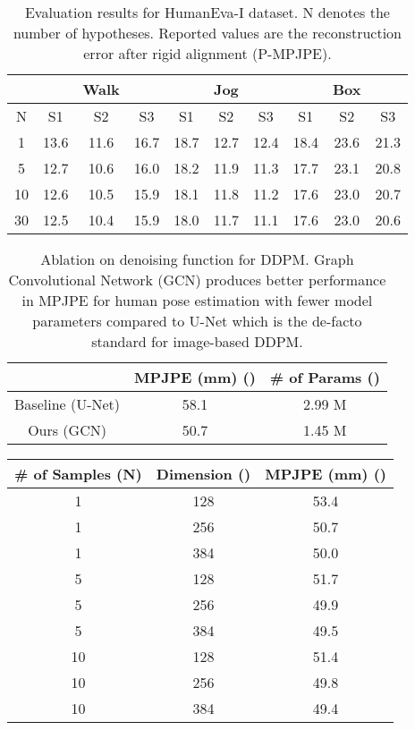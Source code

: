 \documentclass[letterpaper, 10 pt, conference]{ieeeconf}
\begin{document}
\begin{table}[t]
    \centering
    \resizebox{0.45\textwidth}{!}
    {
    \begin{tabular}{c|c c c|c c c|c c c}
    \toprule
          & & Walk & & & Jog & & & Box & \\\hline
         N& S1 & S2 & S3 & S1 & S2 & S3 & S1 & S2 & S3\\
    \midrule
         1 &  13.6& 11.6 & 16.7 & 18.7 & 12.7 &12.4 &  18.4 & 23.6 & 21.3\\
         5 & 12.7& 10.6& 16.0 & 18.2&11.9 &11.3 & 17.7 & 23.1 & 20.8\\
         10 & 12.6 &10.5 &15.9 &18.1 &11.8 &11.2 &17.6 &23.0 & 20.7 \\
         30 & 12.5 & 10.4& 15.9& 18.0& 11.7& 11.1& 17.6 & 23.0 & 20.6\\

    \bottomrule
    \end{tabular}
    }
    \caption{Evaluation results for HumanEva-I dataset. N denotes the number of hypotheses. Reported values are the reconstruction error after rigid alignment (P-MPJPE).}
    \label{tab:table5}
\end{table} \begin{table}[t]
    \centering
    \resizebox{0.4\textwidth}{!}
    {
    \begin{tabular}{c|c|c}
    \toprule
    &MPJPE (mm) ()& \# of Params ()\\
    \midrule
         Baseline (U-Net) & 58.1&2.99 M \\
         Ours (GCN)& 50.7 & 1.45 M\\
    \bottomrule
    \end{tabular}
    }
    \caption{Ablation on denoising function for DDPM.
    Graph Convolutional Network (GCN) produces better performance in MPJPE for human pose estimation with fewer model parameters compared to U-Net which is the de-facto standard for image-based DDPM.
    }
    \label{tab:table2}
    \vspace{-10pt}
\end{table} \begin{table}[t]
    \centering
    \resizebox{0.35\textwidth}{!}
    {
    \begin{tabular}{c|c|c}
    \toprule
         \# of Samples (N)&Dimension () & MPJPE (mm) ()  \\
    \midrule
         1 & 128 & 53.4 \\
         1 & 256 & 50.7 \\
         1 & 384 & 50.0\\
         \hline
         5 & 128 & 51.7 \\
         5 & 256 & 49.9\\
         5 & 384 & 49.5\\
         \hline
         10 & 128 & 51.4 \\
         10 & 256 & 49.8\\
         10 & 384 & 49.4\\
    

\end{tabular}}
\end{table}
\end{document}
